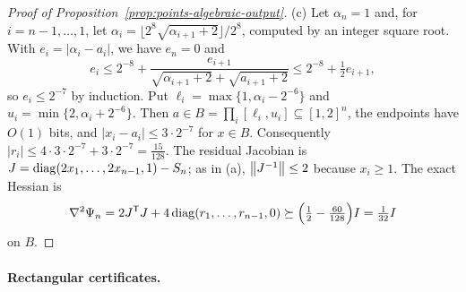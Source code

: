 \begin{proof}[Proof of Proposition~\ref{prop:points-algebraic-output}]
(c) Let $\alpha_n=1$ and, for $i=n-1,\ldots,1$, let
$\alpha_i=\lfloor2^8\sqrt{\alpha_{i+1}+2}\rfloor/2^8$, computed by an integer
square root. With $e_i=|\alpha_i-a_i|$, we have $e_n=0$ and
\[
 e_i\le2^{-8}+\frac{e_{i+1}}{\sqrt{\alpha_{i+1}+2}+\sqrt{a_{i+1}+2}}
 \le2^{-8}+\tfrac12e_{i+1},
\]
so $e_i\le2^{-7}$ by induction. Put $\ell_i=\max\{1,\alpha_i-2^{-6}\}$ and
$u_i=\min\{2,\alpha_i+2^{-6}\}$. Then $a\in B=\prod_i[\ell_i,u_i]\subseteq
[1,2]^n$, the endpoints have $O(1)$ bits, and $|x_i-a_i|\le3\cdot2^{-7}$
for $x\in B$. Consequently $|r_i|\le4\cdot3\cdot2^{-7}+3\cdot2^{-7}=
\frac{15}{128}$. The residual Jacobian is
$J=\operatorname{diag}(2x_1,\ldots,2x_{n-1},1)-S_n$; as in (a),
$\left\lVert J^{-1}\right\rVert\le2$ because $x_i\ge1$. The exact Hessian is
\[
 \nabla^2\Psi_n=2J^{\mathsf T}J+4\operatorname{diag}(r_1,\ldots,r_{n-1},0)
 \succeq\Bigl(\tfrac12-\tfrac{60}{128}\Bigr)I=\tfrac1{32}I
\]
on $B$.
\end{proof}

\paragraph{Rectangular certificates.}

